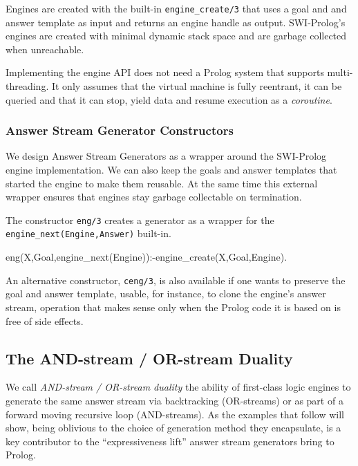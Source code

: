 \documentclass{new_tlp}
\begin{document}
Engines are created with the built-in {\tt engine\_create/3} that uses a goal and and answer template as input and returns an engine handle as output. SWI-Prolog's engines are created with minimal dynamic stack space and are garbage collected when unreachable.

Implementing the engine API does not need  a Prolog system that supports multi-threading. It only assumes that the virtual machine is fully reentrant, it can be queried and that it can stop, yield data and resume execution as a {\em coroutine}.

\begin{comment}
As Prolog virtual machines, engines have  an internal state. Thus interacting with them requires a concise and expressive, but ultimately procedural API. This is not very different from what working with attributed variables, instrumental to adding constraint solvers, requires.
\end{comment}

\subsubsection{Answer Stream Generator Constructors}

We design Answer Stream Generators as a wrapper around the SWI-Prolog engine implementation.
We can also keep the goals and answer templates that started the engine to make them reusable. At the same time this external wrapper ensures that engines stay garbage collectable on termination.

The constructor {\tt eng/3} creates a generator as a wrapper for
the {\tt engine\_next(Engine,Answer)} built-in.
\begin{code}
eng(X,Goal,engine_next(Engine)):-engine_create(X,Goal,Engine). 
\end{code}
An alternative constructor, {\tt ceng/3}, is also available if one wants to preserve
the goal and answer template, usable, for instance, to clone
the engine's answer stream, 
operation that makes sense only when the Prolog code it is based on 
is free of side effects.

\subsection{The AND-stream / OR-stream Duality}

We call {\em AND-stream / OR-stream duality} the
ability of first-class logic engines
 to generate the same answer stream via backtracking (OR-streams) or
as part of a forward moving recursive loop (AND-streams).
As the examples that follow will show,
being oblivious to the choice of generation method they encapsulate,
is a key contributor to the ``expressiveness lift'' answer stream
generators bring to Prolog.
\end{document}
